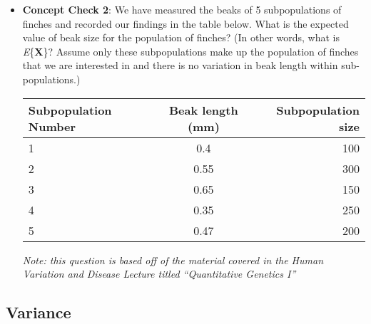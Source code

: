 \documentclass[12pt]{report}
\begin{document}
\begin{itemize}
\item \textbf{Concept Check 2}: We have measured the beaks of 5 subpopulations of finches and recorded our findings in the table below. What is the expected value of beak size for the population of finches? (In other words, what is \textit{E}\{\textbf{X}\}? Assume only these subpopulations make up the population of finches that we are interested in and there is no variation in beak length within sub-populations.) 

\bigskip
\begin{tabular}{| l | c | r |}
	\hline
 Subpopulation Number & Beak length (mm) & Subpopulation size \\ \hline
  1 & 0.4 & 100 \\
  2 & 0.55 &  300 \\
  3 & 0.65 & 150 \\ 
  4 & 0.35 &  250 \\
  5 & 0.47 & 200 \\  \hline
\end{tabular}

\bigskip

\bigskip

\bigskip

\bigskip

\bigskip

\bigskip

\bigskip

\bigskip
\textit{Note: this question is based off of the material covered in the Human Variation and Disease Lecture titled ``Quantitative Genetics I''}

\end{itemize}

\subsection{Variance}
\end{document}
